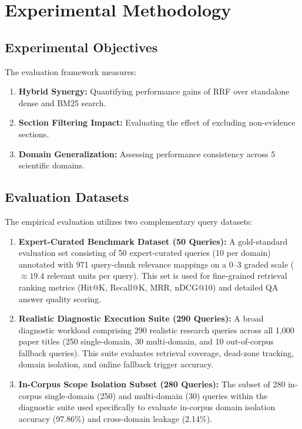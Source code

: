 \documentclass[conference]{IEEEtran}
\begin{document}
\section{Experimental Methodology}

\subsection{Experimental Objectives}

The evaluation framework measures:
\begin{enumerate}
    \item \textbf{Hybrid Synergy:} Quantifying performance gains of RRF over standalone dense and BM25 search.
    \item \textbf{Section Filtering Impact:} Evaluating the effect of excluding non-evidence sections.
    \item \textbf{Domain Generalization:} Assessing performance consistency across 5 scientific domains.
\end{enumerate}

\subsection{Evaluation Datasets}

The empirical evaluation utilizes two complementary query datasets:

\begin{enumerate}
    \item \textbf{Expert-Curated Benchmark Dataset (50 Queries):} A gold-standard evaluation set consisting of 50 expert-curated queries (10 per domain) annotated with 971 query-chunk relevance mappings on a 0--3 graded scale ($\approx 19.4$ relevant units per query). This set is used for fine-grained retrieval ranking metrics (Hit@K, Recall@K, MRR, nDCG@10) and detailed QA answer quality scoring.
    
    \item \textbf{Realistic Diagnostic Execution Suite (290 Queries):} A broad diagnostic workload comprising 290 realistic research queries across all 1,000 paper titles (250 single-domain, 30 multi-domain, and 10 out-of-corpus fallback queries). This suite evaluates retrieval coverage, dead-zone tracking, domain isolation, and online fallback trigger accuracy.
    
    \item \textbf{In-Corpus Scope Isolation Subset (280 Queries):} The subset of 280 in-corpus single-domain (250) and multi-domain (30) queries within the diagnostic suite used specifically to evaluate in-corpus domain isolation accuracy (97.86\%) and cross-domain leakage (2.14\%).
\end{enumerate}
\end{document}
